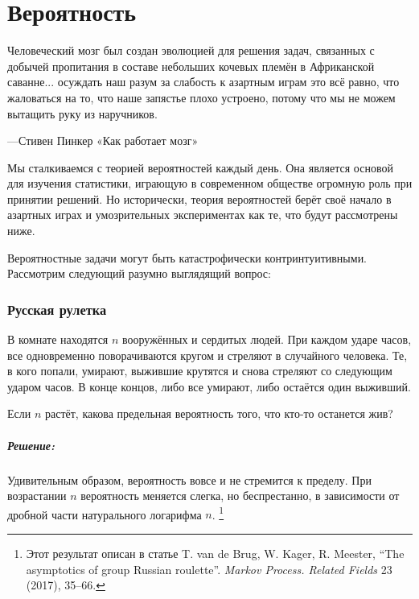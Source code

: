\chapter*{Вероятность}

\setlength{\epigraphwidth}{.85\textwidth}
\epigraph{Человеческий мозг был создан эволюцией для решения задач, связанных с добычей пропитания в составе небольших кочевых племён в Африканской саванне...
осуждать наш разум за слабость к азартным играм это всё равно, что жаловаться на то, что наше запястье плохо устроено, потому что мы не можем вытащить руку из наручников.}{---Стивен Пинкер «Как работает мозг»%
}

Мы сталкиваемся с теорией вероятностей каждый день.
Она является основой для изучения статистики, играющую в современном обществе огромную роль при принятии решений.
Но исторически, теория вероятностей берёт своё начало в азартных играх и умозрительных экспериментах как те, что будут рассмотрены ниже.

\medskip

Вероятностные задачи могут быть катастрофически контринтуитивными.
Рассмотрим следующий разумно выглядящий вопрос:

\subsection*{Русская рулетка} %

В комнате находятся $n$ вооружённых и сердитых людей.
При каждом ударе часов, все одновременно поворачиваются кругом и стреляют в случайного человека.
Те, в кого попали, умирают, выжившие крутятся и снова стреляют со следующим ударом часов.
В конце концов, либо все умирают, либо остаётся один выживший.

Если $n$ растёт, какова предельная вероятность того, что кто-то останется жив?

\paragraph{Решение:} Удивительным образом, вероятность вовсе и не стремится к пределу.
При возрастании $n$ вероятность меняется слегка, но беспрестанно, в зависимости от дробной части натурального логарифма $n$.%
\footnote{Этот результат описан в статье 
T. van de Brug, W. Kager, R. Meester, ``The asymptotics of group Russian roulette''.
\emph{Markov Process. Related Fields} 23 (2017), 35--66.}

